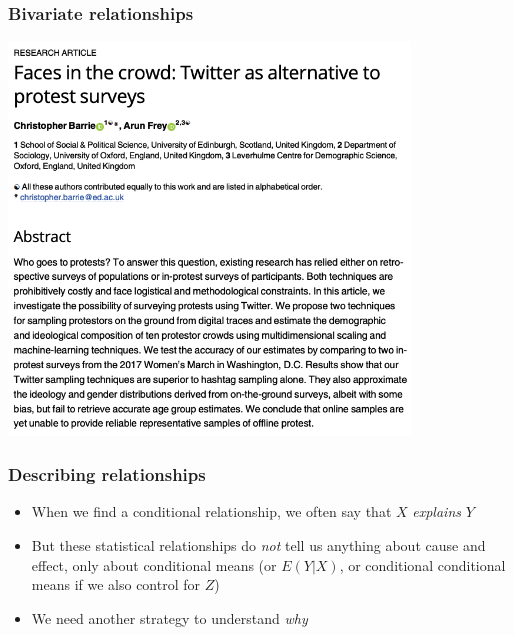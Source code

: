 \documentclass[aspectratio=43]{beamer}
\begin{document}
\begin{frame}
\frametitle{Bivariate relationships}
\centering

\includegraphics[width = 0.8\textwidth]{../img/twitter_protests}

\end{frame}

\begin{frame}
\frametitle{Describing relationships}
\centering

\begin{itemize}
  \item When we find a conditional relationship, we often say that $X$ \textit{explains} $Y$
  \item But these statistical relationships do \textit{not} tell us anything about cause and effect, only about conditional means (or $E(Y|X)$, or conditional conditional means if we also control for $Z$)
  \item We need another strategy to understand \textit{why}
\end{itemize}

\end{frame}
\end{document}
